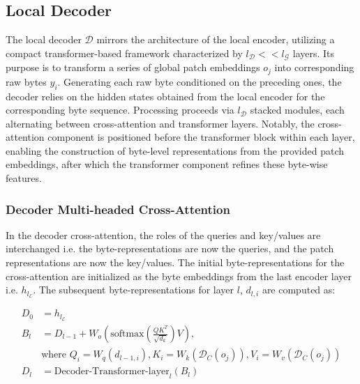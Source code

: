 \subsection{Local Decoder} 

The local decoder $\mathcal{D}$ mirrors the architecture of the local encoder, utilizing a compact transformer-based framework characterized by $l_{\mathcal{D}} << l_{\mathcal{G}}$ layers. Its purpose is to transform a series of global patch embeddings $o_j$ into corresponding raw bytes $y_i$. Generating each raw byte conditioned on the preceding ones, the decoder relies on the hidden states obtained from the local encoder for the corresponding byte sequence. Processing proceeds via $l_{\mathcal{D}}$ stacked modules, each alternating between cross-attention and transformer layers. Notably, the cross-attention component is positioned before the transformer block within each layer, enabling the construction of byte-level representations from the provided patch embeddings, after which the transformer component refines these byte-wise features.

\subsubsection{Decoder Multi-headed Cross-Attention} 

In the decoder cross-attention, the roles of the queries and key/values are interchanged i.e. the byte-representations are now the queries, and the patch representations are now the key/values. The initial byte-representations for the cross-attention are initialized as the byte embeddings from the last encoder layer i.e. $h_{l_{\mathcal{E}}}$. The subsequent byte-representations for layer $l$, $d_{l,i}$ are computed as:

\begin{align}
D_0 &= h_{l_{\mathcal{E}}} \\
B_l &= D_{l-1} + W_o\left(\text{softmax}\left(\frac{QK^T}{\sqrt{d_k}}\right)V\right), \\
  &\text{where } Q_i = W_q(d_{l-1,i}), K_i = W_k(\mathcal{D}_C(o_j)), V_i = W_v(\mathcal{D}_C(o_j)) \\
  D_l &= \text{Decoder-Transformer-layer}_l(B_l)
\end{align}


